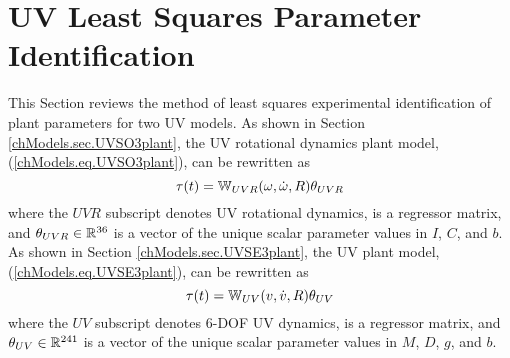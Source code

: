 \section{\acs{UV} Least Squares Parameter Identification} 
\label{chUV_AID.sec.leastSquares}

This Section reviews the method of least squares experimental
identification of plant parameters for two \ac{UV} models.
%
%
%
%
%
%
%
As shown in Section \ref{chModels.sec.UVSO3plant}, the \acl{UV}
rotational dynamics plant model, (\ref{chModels.eq.UVSO3plant}), can
be rewritten as
%
\begin{equation}\label{chUV_AID.eq.UVSO3_LS}
\tau(t)=\mathbb{W}_{UVR}(\omega,\dot{\omega},R) \theta_{UVR}
\end{equation}
%
\noindent where the $UVR$ subscript denotes \ac{UV} rotational dynamics,
 is a regressor matrix, and $\theta_{UVR}\in\mathbb{R}^{36}$ is a
vector of the unique scalar parameter values in $I$, $C$, and $b$. 
%
As shown in Section \ref{chModels.sec.UVSE3plant}, the \acl{UV} plant
model, (\ref{chModels.eq.UVSE3plant}), can be rewritten as
%
\begin{equation}\label{chUV_AID.eq.UVSE3_LS}
\tau(t)=\mathbb{W}_{UV}(v,\dot{v},R) \theta_{UV}
\end{equation}
%
\noindent where the $UV$ subscript denotes 6-\ac{DOF} \ac{UV} dynamics,
 is a regressor matrix, and $\theta_{UV}\in\mathbb{R}^{241}$ is
a vector of the unique scalar parameter values in $M$, $D$, $g$, and
$b$.


